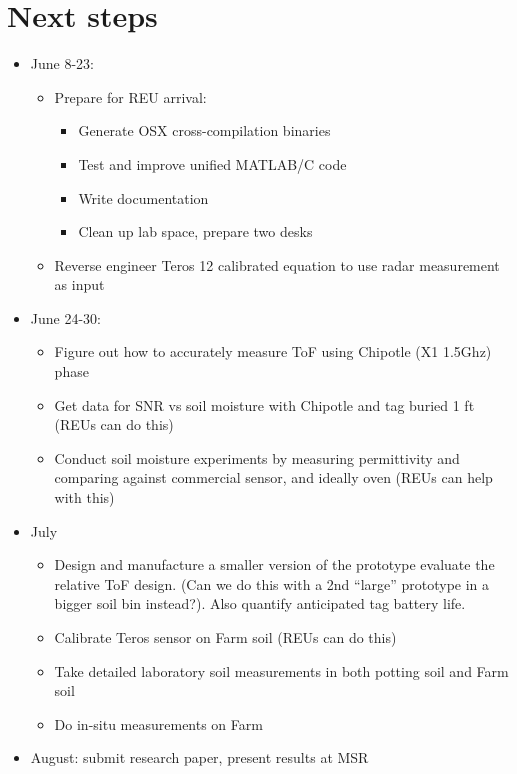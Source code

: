 \documentclass[12pt]{article}
\begin{document}
\section*{Next steps}

\begin{itemize}
\item June 8-23:
\begin{itemize}
\item Prepare for REU arrival:
\begin{itemize}
\item Generate OSX cross-compilation binaries
\item Test and improve unified MATLAB/C code
\item Write documentation
\item Clean up lab space, prepare two desks
\end{itemize}
\item Reverse engineer Teros 12 calibrated equation to use radar
  measurement as input
\end{itemize}

\item June 24-30:
\begin{itemize}
\item Figure out how to accurately measure ToF using Chipotle (X1
  1.5Ghz) phase
\item Get data for SNR vs soil moisture with Chipotle and tag buried 1
  ft (REUs can do this)
\item Conduct soil moisture experiments by measuring permittivity and
  comparing against commercial sensor, and ideally oven (REUs can help
  with this)
\end{itemize}
\item July
\begin{itemize}
\item Design and manufacture a smaller version of the prototype
  evaluate the relative ToF design. (Can we do this with a 2nd
  ``large'' prototype in a bigger soil bin instead?). Also quantify
  anticipated tag battery life.
\item Calibrate Teros sensor on Farm soil (REUs can do this)
\item Take detailed laboratory soil measurements in both potting soil
  and Farm soil
\item Do in-situ measurements on Farm
\end{itemize}
\item August: submit research paper, present results at MSR
\end{itemize}
\end{document}
